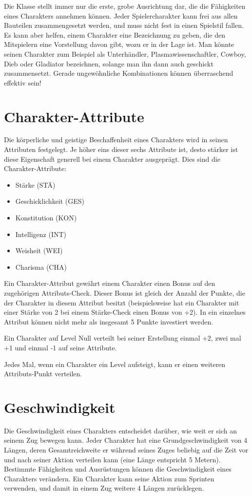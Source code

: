 Die Klasse stellt immer nur die erste, grobe Ausrichtung dar, die die Fähigkeiten eines Charakters annehmen können. Jeder Spielercharakter kann frei aus allen \glqq Bauteilen\grqq{} zusammengesetzt werden, und muss nicht fest in einen Spielstil fallen. Es kann aber helfen, einem Charakter eine Bezeichnung zu geben, die den Mitspielern eine Vorstellung davon gibt, wozu er in der Lage ist. Man könnte seinen Charakter zum Beispiel als \glqq Unterhändler\grqq{}, \glqq Plasmawissenschaftler\grqq{}, \glqq Cowboy\grqq{}, \glqq Dieb\grqq{} oder \glqq Gladiator\grqq{} bezeichnen, solange man ihn dann auch geschickt zusammensetzt. Gerade ungewöhnliche Kombinationen können überraschend effektiv sein!
\section{Charakter-Attribute}
Die körperliche und geistige Beschaffenheit eines Charakters wird in seinen Attributen festgelegt. Je höher eins dieser sechs Attribute ist, desto stärker ist diese Eigenschaft generell bei einem Charakter ausgeprägt.
Dies sind die Charakter-Attribute:
\begin{itemize}
\itemsep0pt
\item Stärke (STÄ)
\item Geschicklichkeit (GES)
\item Konstitution (KON)
\item Intelligenz (INT)
\item Weisheit (WEI)
\item Charisma (CHA)
\end{itemize}
Ein Charakter-Attribut gewährt einem Charakter einen Bonus auf den zugehörigen Attributs-Check. Dieser Bonus ist gleich der Anzahl der Punkte, die der Charakter in diesem Attribut besitzt (beispielsweise hat ein Charakter mit einer Stärke von 2 bei einem Stärke-Check einen Bonus von +2). In ein einzelnes Attribut können nicht mehr als insgesamt 5 Punkte investiert werden.

Ein Charakter auf Level Null verteilt bei seiner Erstellung einmal +2, zwei mal +1 und einmal -1 auf seine Attribute.

Jedes Mal, wenn ein Charakter ein Level aufsteigt, kann er einen weiteren Attributs-Punkt verteilen.
\section{Geschwindigkeit}
Die Geschwindigkeit eines Charakters entscheidet darüber, wie weit er sich an seinem Zug bewegen kann. Jeder Charakter hat eine Grundgeschwindigkeit von 4 Längen, deren Gesamtreichweite er während seines Zuges beliebig auf die Zeit vor und nach seiner Aktion verteilen kann (eine Länge entspricht 5 Metern). Bestimmte Fähigkeiten und Ausrüstungen können die Geschwindigkeit eines Charakters verändern.
Ein Charakter kann seine Aktion zum Sprinten verwenden, und damit in einem Zug weitere 4 Längen zurücklegen.
